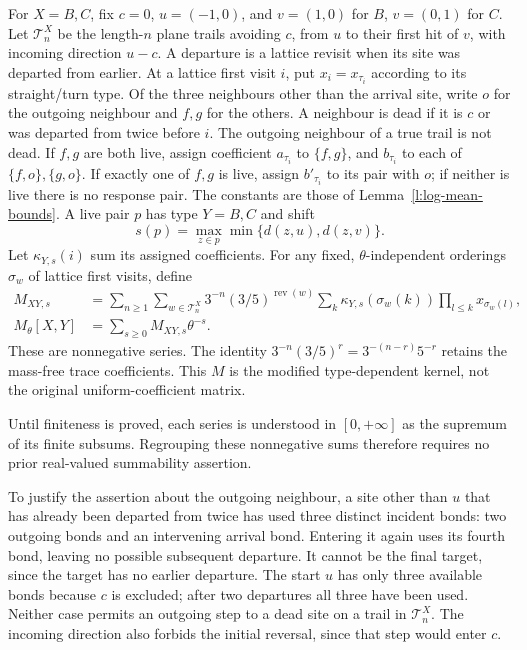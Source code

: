 \begin{definition}\label{d:kernel}
For \(X=B,C\), fix \(c=0\), \(u=(-1,0)\), and \(v=(1,0)\)
for \(B\), \(v=(0,1)\) for \(C\).
Let \(\mathcal T_n^X\) be the length-\(n\) plane trails avoiding \(c\),
from \(u\) to their first hit of \(v\), with incoming direction \(u-c\).
A departure is a lattice revisit when its site was departed from earlier.
At a lattice first visit \(i\), put \(x_i=x_{\tau_i}\) according to
its straight/turn type. Of the three neighbours other than the arrival
site, write \(o\) for the outgoing neighbour and \(f,g\) for the others.
A neighbour is dead if it is \(c\) or was departed from twice before \(i\).
The outgoing neighbour of a true trail is not dead.
If \(f,g\) are both live, assign coefficient \(a_{\tau_i}\) to
\(\{f,g\}\), and \(b_{\tau_i}\) to each of \(\{f,o\},\{g,o\}\).
If exactly one of \(f,g\) is live, assign \(b'_{\tau_i}\) to its
pair with \(o\); if neither is live there is no response pair.
The constants are those of Lemma~\ref{l:log-mean-bounds}.
A live pair \(p\) has type \(Y=B,C\) and shift
\[
 s(p)=\max_{z\in p}\min\{d(z,u),d(z,v)\}.
\]
Let \(\kappa_{Y,s}(i)\) sum its assigned coefficients.
For any fixed, \(\theta\)-independent orderings \(\sigma_w\) of lattice
first visits, define
\[
 \begin{split}
 M_{XY,s}
 &=\sum_{n\ge1}\sum_{w\in\mathcal T_n^X}
     3^{-n}(3/5)^{\operatorname{rev}(w)}
     \sum_k\kappa_{Y,s}(\sigma_w(k))
                   \prod_{l\le k}x_{\sigma_w(l)},\\
 M_\theta[X,Y]&=\sum_{s\ge0}M_{XY,s}\theta^{-s}.
 \end{split}
\]
These are nonnegative series. The identity
\(3^{-n}(3/5)^r=3^{-(n-r)}5^{-r}\) retains the mass-free
trace coefficients. This \(M\) is the modified type-dependent kernel,
not the original uniform-coefficient matrix.
\end{definition}

Until finiteness is proved, each series is understood in
\([0,+\infty]\) as the supremum of its finite subsums.
Regrouping these nonnegative sums therefore requires no prior
real-valued summability assertion.

To justify the assertion about the outgoing neighbour, a site other
than \(u\) that has already been departed from twice has used three
distinct incident bonds: two outgoing bonds and an intervening
arrival bond.  Entering it again uses its fourth bond, leaving no
possible subsequent departure.  It cannot be the final target,
since the target has no earlier departure.  The start \(u\) has
only three available bonds because \(c\) is excluded; after two
departures all three have been used.  Neither case permits an
outgoing step to a dead site on a trail in \(\mathcal T_n^X\).
The incoming direction also forbids the initial reversal, since that
step would enter \(c\).

